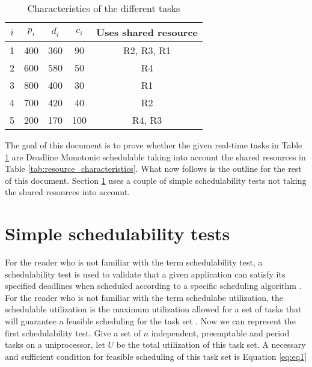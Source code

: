 \documentclass[10pt]{article}
\begin{document}
\begin{table}[H]
    \centering
    \begin{tabular}{|c|c|c|c|c|}
        \hline 
        \textcolor{darkpink}{$i$} & \textcolor{darkpink}{\textit{$p_i$}} & \textcolor{darkpink}{\textit{$d_i$}} & \textcolor{darkpink}{\textit{$c_i$}} & \textcolor{darkpink}{Uses shared resource} \\
        \hline

        1 & 400 & 360 & 90 & R2, R3, R1 \\
        \hline

        2 & 600 & 580 & 50 & R4 \\
        \hline

        3 & 800 & 400 & 30 & R1 \\
        \hline

        4 & 700 & 420 & 40 & R2 \\
        \hline

        5 & 200 & 170 & 100 & R4, R3 \\
        \hline

    \end{tabular}
    
    \label{tab:task_characteristics}
    \caption{Characteristics of the different tasks}
\end{table}

The goal of this document is to prove whether the given real-time tasks in Table \ref{tab:task_characteristics} are Deadline Monotonic schedulable taking into account the shared resources in Table \ref{tab:resource_characteristics}.
What now follows is the outline for the rest of this document.
Section \ref{sec:simple_test} uses a couple of simple schedulability tests not taking the shared resources into account.

\newpage
\section{Simple schedulability tests}
\label{sec:simple_test}

For the reader who is not familiar with the term schedulability test, a schedulability test is used to validate that a given application can satisfy its specified deadlines when scheduled according to a specific scheduling algorithm \cite{cheng}.
For the reader who is not familiar with the term schedulabe utilization, the schedulable utilization is the maximum utilization allowed for a set of tasks that will guarantee a feasible scheduling for the task set \cite{cheng}.
Now we can represent the first schedulability test.
Give a set of $n$ independent, preemptable and period tasks on a uniprocessor, let $U$ be the total utilization of this task set.
A necessary and sufficient condition for feasible scheduling of this task set is Equation \ref{eq:eq1}
\end{document}
